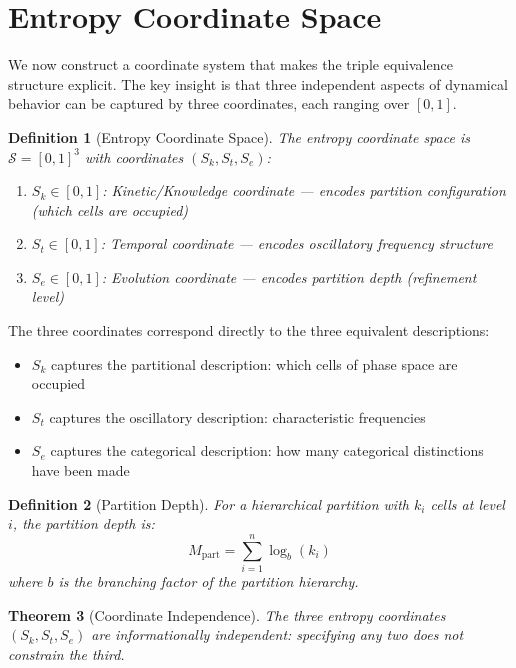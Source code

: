 \documentclass[twocolumn,10pt,a4paper]{article}
\newtheorem{theorem}{Theorem}[section]
\newtheorem{definition}[theorem]{Definition}
\newcommand{\Sspace}{\mathcal{S}}
\newcommand{\Sk}{S_k}
\newcommand{\St}{S_t}
\newcommand{\Se}{S_e}
\newcommand{\Mpart}{M_{\text{part}}}
\begin{document}
\section{Entropy Coordinate Space}
\label{sec:entropy_space}

We now construct a coordinate system that makes the triple equivalence structure explicit. The key insight is that three independent aspects of dynamical behavior can be captured by three coordinates, each ranging over $[0,1]$.

\begin{definition}[Entropy Coordinate Space]
\label{def:entropy_space}
The \emph{entropy coordinate space} is $\Sspace = [0,1]^3$ with coordinates $(\Sk, \St, \Se)$:
\begin{enumerate}[label=(\roman*)]
    \item $\Sk \in [0,1]$: \emph{Kinetic/Knowledge coordinate} --- encodes partition configuration (which cells are occupied)
    \item $\St \in [0,1]$: \emph{Temporal coordinate} --- encodes oscillatory frequency structure
    \item $\Se \in [0,1]$: \emph{Evolution coordinate} --- encodes partition depth (refinement level)
\end{enumerate}
\end{definition}

The three coordinates correspond directly to the three equivalent descriptions:
\begin{itemize}
    \item $\Sk$ captures the partitional description: which cells of phase space are occupied
    \item $\St$ captures the oscillatory description: characteristic frequencies
    \item $\Se$ captures the categorical description: how many categorical distinctions have been made
\end{itemize}

\begin{definition}[Partition Depth]
\label{def:partition_depth}
For a hierarchical partition with $k_i$ cells at level $i$, the \emph{partition depth} is:
\begin{equation}
\Mpart = \sum_{i=1}^n \log_b(k_i)
\end{equation}
where $b$ is the branching factor of the partition hierarchy.
\end{definition}

\begin{theorem}[Coordinate Independence]
\label{thm:coord_indep}
The three entropy coordinates $(\Sk, \St, \Se)$ are informationally independent: specifying any two does not constrain the third.
\end{theorem}
\end{document}
